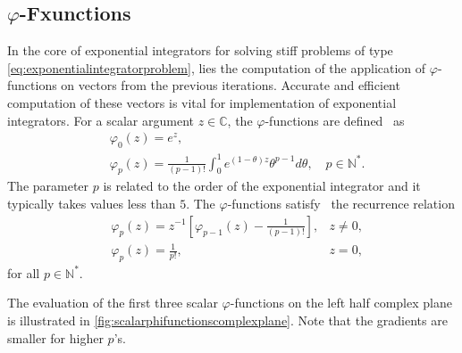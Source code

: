 \subsection{\texorpdfstring{$\varphi$}{Phi}-Fxunctions}
In the core of exponential integrators for solving stiff problems of type
\eqref{eq:exponentialintegratorproblem}, lies the computation of the application of
$\varphi$-functions on vectors from the previous iterations. Accurate and efficient computation of
these vectors is vital for implementation of exponential integrators.
For a scalar argument $z \in \mathbb{C}$, the $\varphi$-functions are
defined~\cite{higham2008functions} as
\begin{equation}
    \label{eq:scalarphifunctionsdefinition}
    \begin{aligned}
        & \varphi_0(z) = e^z,\\
        & \varphi_p(z) = \frac{1}{(p-1)!} \int_{0}^{1}{e^{(1 - \theta)z} \theta^{p-1} d\theta},
        \quad p \in \mathbb{N^*}.
    \end{aligned}
\end{equation}
The parameter $p$ is related to the order of the exponential integrator and it typically takes
values less than $5$.
The $\varphi$-functions satisfy~\cite{higham2008functions} the recurrence relation
\begin{equation}
    \label{eq:scalarphifunctionsrecurrence}
    \begin{aligned}
        & \varphi_p(z) = z^{-1} \left[ \varphi_{p-1}(z) - \frac{1}{(p-1)!} \right] ,
        & z \neq 0,
        \\
        & \varphi_p(z) = \frac{1}{p!},
        & z = 0,
    \end{aligned}
\end{equation}
for all $p \in \mathbb{N^*}$.

The evaluation of the first three scalar $\varphi$-functions on the left half complex plane
is illustrated in \autoref{fig:scalarphifunctionscomplexplane}. Note that the gradients are
smaller for higher $p$'s.

